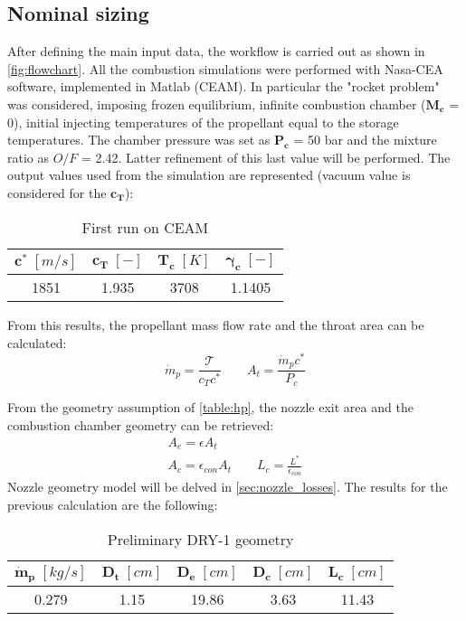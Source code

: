 \subsection{Nominal sizing}
\label{subsec:nominal}
After defining the main input data, the workflow is carried out as shown in \autoref{fig:flowchart}. All the combustion simulations were performed with Nasa-CEA software, implemented in Matlab (CEAM). In particular the "rocket problem" was considered, imposing frozen equilibrium, infinite combustion chamber ($\boldsymbol{M_c}$ = 0), initial injecting temperatures of the propellant equal to the storage temperatures. The chamber pressure was set as $\boldsymbol{P_c}$ = 50 bar and the mixture ratio as $O/F$ = 2.42. Latter refinement of this last value will be performed. The output values used from the simulation are represented (vacuum value is considered for the $\boldsymbol{c_T}$):
\begin{table}[H]
    \renewcommand{\arraystretch}{1.2}
    \centering
    \begin{tabular}{|c|c|c|c|}
        \hline
        $\boldsymbol{c^*} \; [m/s]$ & $\boldsymbol{c_T} \; [-]$ & $\boldsymbol{T_c} \; [K]$ & $\boldsymbol{\gamma_c} \; [-]$ \\
        \hline
        \hline
        1851 & 1.935 & 3708 & 1.1405 \\
        \hline
    \end{tabular}
    \caption{First run on CEAM}
    \label{table:out_CEA_1}
\end{table}

From this results, the propellant mass flow rate and the throat area can be calculated:
\begin{equation}
    \dot{m}_p = \frac{\mathcal{T}}{c_T c^*} 
    \qquad 
    A_t = \frac{\dot{m}_p c^*}{P_c}
\end{equation}

From the geometry assumption of \autoref{table:hp}, the nozzle exit area and the combustion chamber geometry can be retrieved:
\begin{gather}
    A_e = \epsilon A_t
    \\
    A_c = \epsilon_{con} A_t \qquad L_c = \frac{L^*}{\epsilon_{con}}
\end{gather}
Nozzle geometry model will be delved in \autoref{sec:nozzle_losses}. The results for the previous calculation are the following:

\begin{table}[H]
    \renewcommand{\arraystretch}{1.2}
    \centering
    \begin{tabular}{|c|c|c|c|c|}
        \hline
        $\boldsymbol{\dot{m}_p} \; [kg/s]$ & $\boldsymbol{D_t} \; [cm]$ & $\boldsymbol{D_e} \; [cm]$  & $\boldsymbol{D_{c}} \; [cm]$ & $\boldsymbol{L_c} \; [cm]$ \\
        \hline
        \hline
        0.279 & 1.15 & 19.86 & 3.63 & 11.43 \\
        \hline
    \end{tabular}
    \caption{Preliminary DRY-1 geometry}
    \label{table:preliminary_dry}
\end{table}

